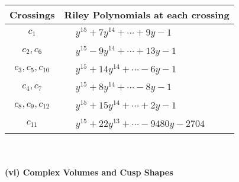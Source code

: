 \documentclass[1p]{elsarticle_modified}
\theoremstyle{definition}
\begin{document}
\begin{tabular}{m{50pt}|m{274pt}}
Crossings & \hspace{64pt}Riley Polynomials at each crossing \\
\hline $$\begin{aligned}c_{1}\end{aligned}$$&$\begin{aligned}
&y^{15}+7 y^{14}+\cdots+9 y-1
\end{aligned}$\\
\hline $$\begin{aligned}c_{2},c_{6}\end{aligned}$$&$\begin{aligned}
&y^{15}-9 y^{14}+\cdots+13 y-1
\end{aligned}$\\
\hline $$\begin{aligned}c_{3},c_{5},c_{10}\end{aligned}$$&$\begin{aligned}
&y^{15}+14 y^{14}+\cdots-6 y-1
\end{aligned}$\\
\hline $$\begin{aligned}c_{4},c_{7}\end{aligned}$$&$\begin{aligned}
&y^{15}+8 y^{14}+\cdots-8 y-1
\end{aligned}$\\
\hline $$\begin{aligned}c_{8},c_{9},c_{12}\end{aligned}$$&$\begin{aligned}
&y^{15}+15 y^{14}+\cdots+2 y-1
\end{aligned}$\\
\hline $$\begin{aligned}c_{11}\end{aligned}$$&$\begin{aligned}
&y^{15}+22 y^{13}+\cdots-9480 y-2704
\end{aligned}$\\
\hline
\end{tabular}\\~\\
\newpage\flushleft \textbf{(vi) Complex Volumes and Cusp Shapes}
\end{document}
